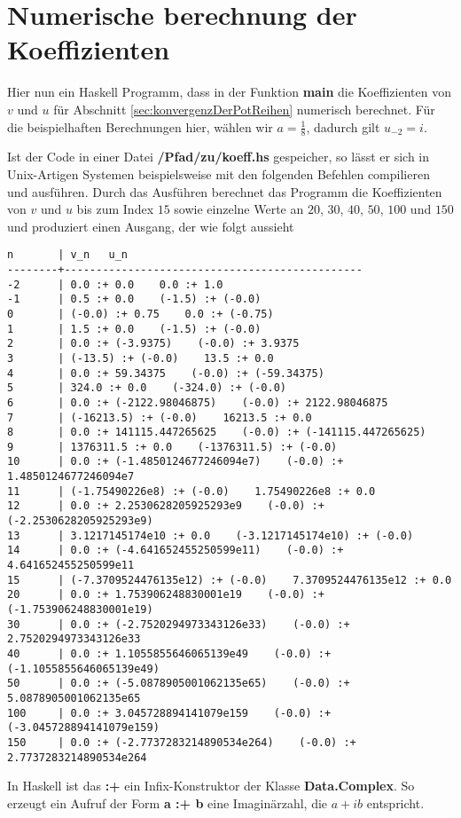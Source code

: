 \chapter{Numerische berechnung der Koeffizienten} \label{anh:Programm}
Hier nun ein Haskell Programm, dass in der Funktion \textbf{main} die
Koeffizienten von $v$ und $u$ für Abschnitt \ref{sec:konvergenzDerPotReihen} 
numerisch berechnet. Für die beispielhaften Berechnungen hier, wählen wir
$a=\frac{1}{8}$, dadurch gilt $u_{-2}=i$.



Ist der Code in einer Datei \textbf{/Pfad/zu/koeff.hs} gespeicher, so lässt er
sich in Unix-Artigen Systemen beispielsweise mit den folgenden Befehlen
compilieren und ausführen.
%
Durch das Ausführen berechnet das Programm die Koeffizienten von $v$ und $u$
bis zum Index $15$ sowie einzelne Werte an $20$, $30$, $40$, $50$, $100$ und
$150$ und produziert einen Ausgang, der wie folgt aussieht
\begin{lstlisting}[style=Bash]
n       | v_n   u_n
--------+-----------------------------------------------
-2      | 0.0 :+ 0.0    0.0 :+ 1.0
-1      | 0.5 :+ 0.0    (-1.5) :+ (-0.0)
0       | (-0.0) :+ 0.75    0.0 :+ (-0.75)
1       | 1.5 :+ 0.0    (-1.5) :+ (-0.0)
2       | 0.0 :+ (-3.9375)    (-0.0) :+ 3.9375
3       | (-13.5) :+ (-0.0)    13.5 :+ 0.0
4       | 0.0 :+ 59.34375    (-0.0) :+ (-59.34375)
5       | 324.0 :+ 0.0    (-324.0) :+ (-0.0)
6       | 0.0 :+ (-2122.98046875)    (-0.0) :+ 2122.98046875
7       | (-16213.5) :+ (-0.0)    16213.5 :+ 0.0
8       | 0.0 :+ 141115.447265625    (-0.0) :+ (-141115.447265625)
9       | 1376311.5 :+ 0.0    (-1376311.5) :+ (-0.0)
10      | 0.0 :+ (-1.4850124677246094e7)    (-0.0) :+ 1.4850124677246094e7
11      | (-1.75490226e8) :+ (-0.0)    1.75490226e8 :+ 0.0
12      | 0.0 :+ 2.2530628205925293e9    (-0.0) :+ (-2.2530628205925293e9)
13      | 3.1217145174e10 :+ 0.0    (-3.1217145174e10) :+ (-0.0)
14      | 0.0 :+ (-4.641652455250599e11)    (-0.0) :+ 4.641652455250599e11
15      | (-7.3709524476135e12) :+ (-0.0)    7.3709524476135e12 :+ 0.0
20      | 0.0 :+ 1.753906248830001e19    (-0.0) :+ (-1.753906248830001e19)
30      | 0.0 :+ (-2.7520294973343126e33)    (-0.0) :+ 2.7520294973343126e33
40      | 0.0 :+ 1.1055855646065139e49    (-0.0) :+ (-1.1055855646065139e49)
50      | 0.0 :+ (-5.0878905001062135e65)    (-0.0) :+ 5.0878905001062135e65
100     | 0.0 :+ 3.045728894141079e159    (-0.0) :+ (-3.045728894141079e159)
150     | 0.0 :+ (-2.7737283214890534e264)    (-0.0) :+ 2.7737283214890534e264
\end{lstlisting}
In Haskell ist das \textbf{:+} ein Infix-Konstruktor der Klasse
\textbf{Data.Complex}. So erzeugt ein Aufruf der Form \textbf{a :+ b} eine
Imaginärzahl, die $a+ib$ entspricht.

